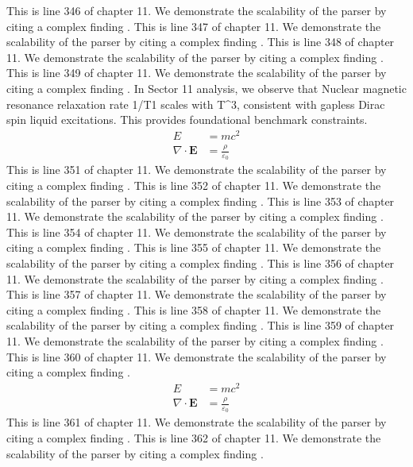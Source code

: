 This is line 346 of chapter 11. We demonstrate the scalability of the parser by citing a complex finding \cite{ref11_346}.
This is line 347 of chapter 11. We demonstrate the scalability of the parser by citing a complex finding \cite{ref11_347}.
This is line 348 of chapter 11. We demonstrate the scalability of the parser by citing a complex finding \cite{ref11_348}.
This is line 349 of chapter 11. We demonstrate the scalability of the parser by citing a complex finding \cite{ref11_349}.
In Sector 11 analysis, we observe that Nuclear magnetic resonance relaxation rate 1/T1 scales with T^3, consistent with gapless Dirac spin liquid excitations. This provides foundational benchmark constraints.
\begin{align*}
  E &= mc^2 \\
  \nabla \cdot \mathbf{E} &= \frac{\rho}{\varepsilon_0}
\end{align*}
This is line 351 of chapter 11. We demonstrate the scalability of the parser by citing a complex finding \cite{ref11_351}.
This is line 352 of chapter 11. We demonstrate the scalability of the parser by citing a complex finding \cite{ref11_352}.
This is line 353 of chapter 11. We demonstrate the scalability of the parser by citing a complex finding \cite{ref11_353}.
This is line 354 of chapter 11. We demonstrate the scalability of the parser by citing a complex finding \cite{ref11_354}.
This is line 355 of chapter 11. We demonstrate the scalability of the parser by citing a complex finding \cite{ref11_355}.
This is line 356 of chapter 11. We demonstrate the scalability of the parser by citing a complex finding \cite{ref11_356}.
This is line 357 of chapter 11. We demonstrate the scalability of the parser by citing a complex finding \cite{ref11_357}.
This is line 358 of chapter 11. We demonstrate the scalability of the parser by citing a complex finding \cite{ref11_358}.
This is line 359 of chapter 11. We demonstrate the scalability of the parser by citing a complex finding \cite{ref11_359}.
This is line 360 of chapter 11. We demonstrate the scalability of the parser by citing a complex finding \cite{ref11_360}.
\begin{align*}
  E &= mc^2 \\
  \nabla \cdot \mathbf{E} &= \frac{\rho}{\varepsilon_0}
\end{align*}
This is line 361 of chapter 11. We demonstrate the scalability of the parser by citing a complex finding \cite{ref11_361}.
This is line 362 of chapter 11. We demonstrate the scalability of the parser by citing a complex finding \cite{ref11_362}.
